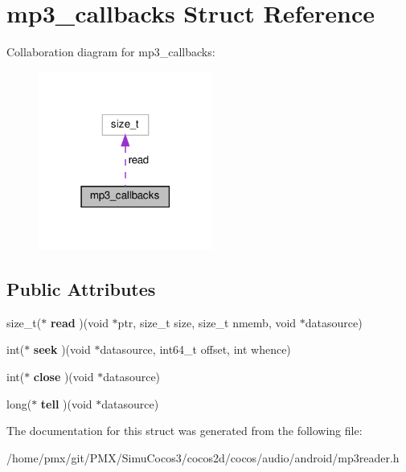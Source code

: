 \hypertarget{structmp3__callbacks}{}\section{mp3\+\_\+callbacks Struct Reference}
\label{structmp3__callbacks}


Collaboration diagram for mp3\+\_\+callbacks\+:
\nopagebreak
\begin{figure}[H]
\begin{center}
\leavevmode
\includegraphics[width=162pt]{structmp3__callbacks__coll__graph}
\end{center}
\end{figure}
\subsection*{Public Attributes}
\begin{DoxyCompactItemize}
\item 
\mbox{\label{structmp3__callbacks_ab414e2b059212f5db749f6dd8b8e3072}} 
size\+\_\+t($\ast$ {\bfseries read} )(void $\ast$ptr, size\+\_\+t size, size\+\_\+t nmemb, void $\ast$datasource)
\item 
\mbox{\label{structmp3__callbacks_a8dd079b26bb3412caf3e0d1a942833c5}} 
int($\ast$ {\bfseries seek} )(void $\ast$datasource, int64\+\_\+t offset, int whence)
\item 
\mbox{\label{structmp3__callbacks_adb3c18d551c226673060c19262cb39b5}} 
int($\ast$ {\bfseries close} )(void $\ast$datasource)
\item 
\mbox{\label{structmp3__callbacks_a1a73ddea1960e9bfeb650040a86b9add}} 
long($\ast$ {\bfseries tell} )(void $\ast$datasource)
\end{DoxyCompactItemize}


The documentation for this struct was generated from the following file\+:\begin{DoxyCompactItemize}
\item 
/home/pmx/git/\+P\+M\+X/\+Simu\+Cocos3/cocos2d/cocos/audio/android/mp3reader.\+h\end{DoxyCompactItemize}
